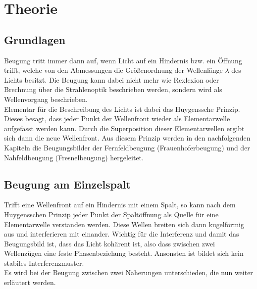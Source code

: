 \section{Theorie}
\label{sec:Theorie}
\subsection{Grundlagen}
\label{sec:grundlagen}
Beugung tritt immer dann auf, wenn Licht auf ein Hindernis bzw. ein Öffnung trifft, welche von den Abmessungen die Größenordnung der Wellenlänge $\lambda$ des Lichts
besitzt. Die Beugung kann dabei nicht mehr wie Rexlexion oder Brechnung über die Strahlenoptik beschrieben werden, sondern wird als Wellenvorgang
beschrieben.
\\\noindent
Elementar für die Beschreibung des Lichts ist dabei das Huygenssche Prinzip. Dieses besagt, dass jeder Punkt der Wellenfront wieder als Elementarwelle
aufgefasst werden kann. Durch die Superposition dieser Elementarwellen ergibt sich dann die neue Wellenfront. Aus diesem Prinzip werden in den nachfolgenden
Kapiteln die Beugungsbilder der Fernfeldbeugung (Frauenhoferbeugung) und der Nahfeldbeugung (Fresnelbeugung) hergeleitet.

\subsection{Beugung am Einzelspalt}
\label{sec:einzel}
Trifft eine Wellenfront auf ein Hindernis mit einem Spalt, so kann nach dem Huygensschen Prinzip jeder Punkt der Spaltöffnung als Quelle für eine Elementarwelle
verstanden werden. Diese Wellen breiten sich dann kugelförmig aus und interferieren mit einander. Wichtig für die Interferenz und damit das Beugungsbild ist,
dass das Licht kohärent ist, also dass zwischen zwei Wellenzügen eine feste Phasenbeziehung besteht. Ansonsten ist bildet sich kein stabiles Interferenzmuster.
\\\noindent
Es wird bei der Beugung zwischen zwei Näherungen unterschieden,
die nun weiter erläutert werden.

